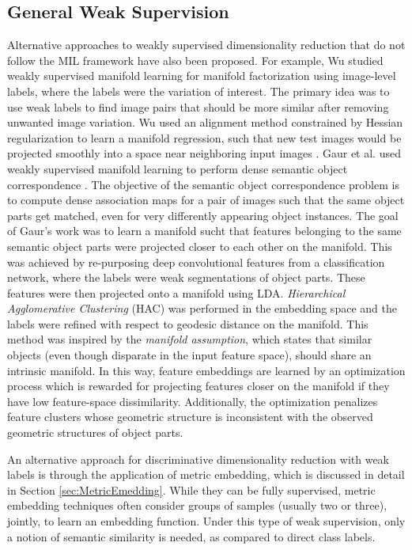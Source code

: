 \subsection{General Weak Supervision}
Alternative approaches to weakly supervised dimensionality reduction that do not follow the MIL framework have also been proposed.  For example, Wu studied weakly supervised manifold learning for manifold factorization using image-level labels, where the labels were the variation of interest.  The primary idea was to use weak labels to find image pairs that should be more similar after removing unwanted image variation.  Wu used an alignment method constrained by Hessian regularization to learn a manifold regression, such that new test images would be projected smoothly into a space near neighboring input images \citep{Wu2015MILImageManifoldThesis}.  Gaur et al. used weakly supervised manifold learning to perform dense semantic object correspondence \citep{Gaur2017MILSemanticObjectCorrespondence}. The objective of the semantic object correspondence problem is to compute dense association maps for a pair of images such that the same object parts get matched, even for very differently appearing object instances. The goal of Gaur's work was to learn a manifold sucht that features belonging to the same semantic object parts were projected closer to each other on the manifold. This was achieved by re-purposing deep convolutional features from a classification network, where the labels were weak segmentations of object parts.  These features were then projected onto a manifold using LDA. \textit{Hierarchical Agglomerative Clustering} (HAC) was performed in the embedding space and the labels were refined with respect to geodesic distance on the manifold.  This method was inspired by the \textit{manifold assumption}, which states that similar objects (even though disparate in the input feature space), should share an intrinsic manifold.  In this way, feature embeddings are learned by an optimization process which is rewarded for projecting features closer on the manifold if they have low feature-space dissimilarity.  Additionally, the optimization penalizes feature clusters whose geometric structure is inconsistent with the observed geometric structures of object parts.  

An alternative approach for discriminative dimensionality reduction with weak labels is through the application of metric embedding, which is discussed in detail in Section \ref{sec:MetricEmedding}.  While they can be fully supervised, metric embedding techniques often consider groups of samples (usually two or three), jointly, to learn an embedding function.  Under this type of weak supervision, only a notion of semantic similarity is needed,  as compared to direct class labels. 


